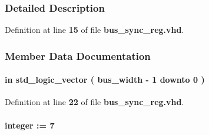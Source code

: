 \subsubsection{Detailed Description}


Definition at line {\bf 15} of file {\bf bus\+\_\+sync\+\_\+reg.\+vhd}.



\subsubsection{Member Data Documentation}
\paragraph[{async\+\_\+in}]{ {\bfseries \textcolor{keywordflow}{in}\textcolor{vhdlchar}{ }} {\bfseries \textcolor{comment}{std\+\_\+logic\+\_\+vector}\textcolor{vhdlchar}{ }\textcolor{vhdlchar}{(}\textcolor{vhdlchar}{ }\textcolor{vhdlchar}{ }\textcolor{vhdlchar}{ }\textcolor{vhdlchar}{ }{\bfseries {\bf bus\+\_\+width}} \textcolor{vhdlchar}{-\/}\textcolor{vhdlchar}{ } \textcolor{vhdldigit}{1} \textcolor{vhdlchar}{ }\textcolor{keywordflow}{downto}\textcolor{vhdlchar}{ }\textcolor{vhdlchar}{ } \textcolor{vhdldigit}{0} \textcolor{vhdlchar}{ }\textcolor{vhdlchar}{)}\textcolor{vhdlchar}{ }} \hspace{0.3cm}{\ttfamily [Port]}}\label{classbus__sync__reg_af7511757fc3415c56d0a4827e8a13f4c}


Definition at line {\bf 22} of file {\bf bus\+\_\+sync\+\_\+reg.\+vhd}.

\paragraph[{bus\+\_\+width}]{ {\bfseries \textcolor{vhdlchar}{ }} {\bfseries \textcolor{comment}{integer}\textcolor{vhdlchar}{ }\textcolor{vhdlchar}{ }\textcolor{vhdlchar}{\+:}\textcolor{vhdlchar}{=}\textcolor{vhdlchar}{ }\textcolor{vhdlchar}{ } \textcolor{vhdldigit}{7} \textcolor{vhdlchar}{ }} \hspace{0.3cm}{\ttfamily [Generic]}}\label{classbus__sync__reg_a007e00c95bfd97b42db09e34c80e97f1}


